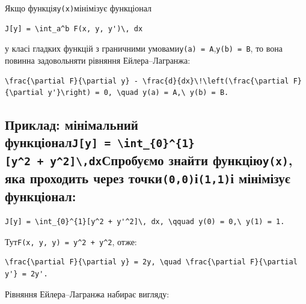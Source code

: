 \documentclass[
  ukrainian,
]{article}
\begin{document}
Якщо функція\texttt{y(x)}мінімізує функціонал

\begin{verbatim}
J[y] = \int_a^b F(x, y, y')\, dx
\end{verbatim}

у класі гладких функцій з граничними
умовами\texttt{y(a)\ =\ A},\texttt{y(b)\ =\ B}, то вона повинна
задовольняти рівняння Ейлера--Лагранжа:

\begin{verbatim}
\frac{\partial F}{\partial y} - \frac{d}{dx}\!\left(\frac{\partial F}{\partial y'}\right) = 0, \quad y(a) = A,\ y(b) = B.
\end{verbatim}

\subsection{\texorpdfstring{Приклад: мінімальний
функціонал\texttt{J{[}y{]}\ =\ \textbackslash{}int\_\{0\}\^{}\{1\}{[}y\^{}2\ +\ y\textquotesingle{}\^{}2{]}\textbackslash{},dx}Спробуємо
знайти функцію\texttt{y(x)}, яка проходить через
точки\texttt{(0,0)}і\texttt{(1,1)}і мінімізує
функціонал:}{Приклад: мінімальний функціоналJ{[}y{]} = \textbackslash int\_\{0\}\^{}\{1\}{[}y\^{}2 + y\textquotesingle\^{}2{]}\textbackslash,dxСпробуємо знайти функціюy(x), яка проходить через точки(0,0)і(1,1)і мінімізує функціонал:}}\label{ux43fux440ux438ux43aux43bux430ux434-ux43cux456ux43dux456ux43cux430ux43bux44cux43dux438ux439-ux444ux443ux43dux43aux446ux456ux43eux43dux430ux43bjy-int_01y2-y2dxux441ux43fux440ux43eux431ux443ux454ux43cux43e-ux437ux43dux430ux439ux442ux438-ux444ux443ux43dux43aux446ux456ux44eyx-ux44fux43aux430-ux43fux440ux43eux445ux43eux434ux438ux442ux44c-ux447ux435ux440ux435ux437-ux442ux43eux447ux43aux43800ux45611ux456-ux43cux456ux43dux456ux43cux456ux437ux443ux454-ux444ux443ux43dux43aux446ux456ux43eux43dux430ux43b}

\begin{verbatim}
J[y] = \int_{0}^{1}[y^2 + y'^2]\, dx, \qquad y(0) = 0,\ y(1) = 1.
\end{verbatim}

Тут\texttt{F(x,\ y,\ y\textquotesingle{})\ =\ y\^{}2\ +\ y\textquotesingle{}\^{}2},
отже:

\begin{verbatim}
\frac{\partial F}{\partial y} = 2y, \quad \frac{\partial F}{\partial y'} = 2y'.
\end{verbatim}

Рівняння Ейлера--Лагранжа набирає вигляду:
\end{document}
